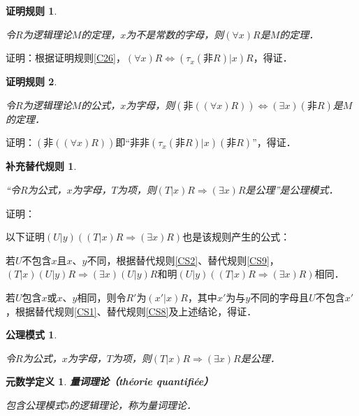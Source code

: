 \documentclass[12pt, a4paper, oneside]{book}
\newtheorem{metadef}{元数学定义}
\newtheorem{CScor}{补充替代规则}
\newtheorem{C}{证明规则}
\newtheorem{Sch}{公理模式}
\begin{document}
			\begin{C}\label{C27}
				\hfill\par
				令$R$为逻辑理论$M$的定理，$x$为不是常数的字母，则$(\forall x)R$是$M$的定理．
			\end{C}
			证明：根据证明规则\ref{C26}，$(\forall x)R\Leftrightarrow(\tau_x(\text{非}R)|x)R$，得证．

			\begin{C}\label{C28}
				\hfill\par
				令$R$为逻辑理论$M$的公式，$x$为字母，则$(\text{非}((\forall x)R))\Leftrightarrow(\exists x)(\text{非}R)$是$M$的定理．
			\end{C}
			证明：$(\text{非}((\forall x)R))$即“$\text{非}\text{非}(\tau_x(\text{非}R)|x)(\text{非}R)$”，得证．

			\begin{CScor}\label{CScor6}
				\hfill\par
				“令$R$为公式，$x$为字母，$T$为项，则$(T|x)R\Rightarrow(\exists x)R$是公理”是公理模式．
			\end{CScor}
			证明：
			\par
			以下证明$(U|y)((T|x)R\Rightarrow(\exists x)R)$也是该规则产生的公式：
			\par
			若$U$不包含$x$且$x$、$y$不同，根据替代规则\ref{CS2}、替代规则\ref{CS9}，$(T|x)(U|y)R\Rightarrow(\exists x)(U|y)R$和明$(U|y)((T|x)R\Rightarrow(\exists x)R)$相同．
			\par
			若$U$包含$x$或$x$、$y$相同，则令$R'$为$(x'|x)R$，其中$x'$为与$y$不同的字母且$U$不包含$x'$，根据替代规则\ref{CS1}、替代规则\ref{CS8}及上述结论，得证．

			\begin{Sch}\label{Sch5}
				\hfill\par
				令$R$为公式，$x$为字母，$T$为项，则$(T|x)R\Rightarrow(\exists x)R$是公理．
			\end{Sch}

			\begin{metadef}
				\textbf{量词理论（théorie quantifiée）}
				\par
				包含公理模式$5$的逻辑理论，称为量词理论．
			\end{metadef}
\end{document}
